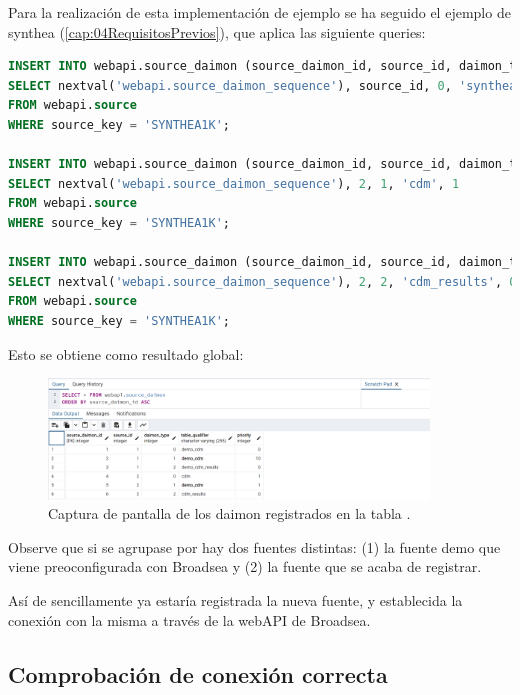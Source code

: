 \begin{enumerate}
    Para la realización de esta implementación de ejemplo se ha seguido el ejemplo de synthea (\ref{cap:04RequisitosPrevios}), que aplica las siguiente queries:

\begin{lstlisting}[language=sql]
INSERT INTO webapi.source_daimon (source_daimon_id, source_id, daimon_type, table_qualifier, priority) 
SELECT nextval('webapi.source_daimon_sequence'), source_id, 0, 'synthea', 0
FROM webapi.source
WHERE source_key = 'SYNTHEA1K';

INSERT INTO webapi.source_daimon (source_daimon_id, source_id, daimon_type, table_qualifier, priority) 
SELECT nextval('webapi.source_daimon_sequence'), 2, 1, 'cdm', 1
FROM webapi.source
WHERE source_key = 'SYNTHEA1K';

INSERT INTO webapi.source_daimon (source_daimon_id, source_id, daimon_type, table_qualifier, priority) 
SELECT nextval('webapi.source_daimon_sequence'), 2, 2, 'cdm_results', 0
FROM webapi.source
WHERE source_key = 'SYNTHEA1K';
\end{lstlisting}

    Esto se obtiene como resultado global:

\begin{figure}[H]
    \centering
    \includegraphics[width=0.90\textwidth]{figures/queryDaimon.png}
    \caption{Captura de pantalla de los daimon registrados en la tabla .}
    \label{fig:queryDaimon}
\end{figure}

    Observe que si se agrupase por  hay dos fuentes distintas: (1) la fuente demo que viene preoconfigurada con Broadsea y (2) la fuente que se acaba de registrar.

\end{enumerate}

Así de sencillamente ya estaría registrada la nueva fuente, y establecida la conexión con la misma a través de la webAPI de Broadsea.


\subsection{Comprobación de conexión correcta}


